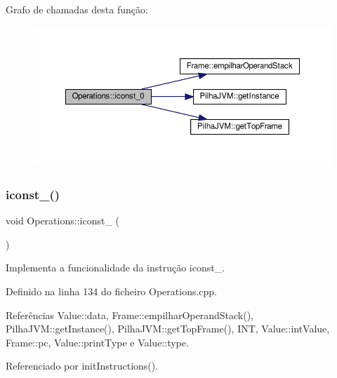 Grafo de chamadas desta função\+:
\nopagebreak
\begin{figure}[H]
\begin{center}
\leavevmode
\includegraphics[width=350pt]{classOperations_a89879486791daebe6659b96688465c9d_cgraph}
\end{center}
\end{figure}
\mbox{\label{classOperations_a3933ba76ead633a53683ff8491a313ea}} 
\subsubsection{\texorpdfstring{iconst\+\_()}{iconst\_1()}}
{\footnotesize\ttfamily void Operations\+::iconst\+\_ (\begin{DoxyParamCaption}{ }\end{DoxyParamCaption})\hspace{0.3cm}{\ttfamily [private]}}



Implementa a funcionalidade da instrução iconst\+\_. 



Definido na linha 134 do ficheiro Operations.\+cpp.



Referências Value\+::data, Frame\+::empilhar\+Operand\+Stack(), Pilha\+J\+V\+M\+::get\+Instance(), Pilha\+J\+V\+M\+::get\+Top\+Frame(), I\+NT, Value\+::int\+Value, Frame\+::pc, Value\+::print\+Type e Value\+::type.



Referenciado por init\+Instructions().

